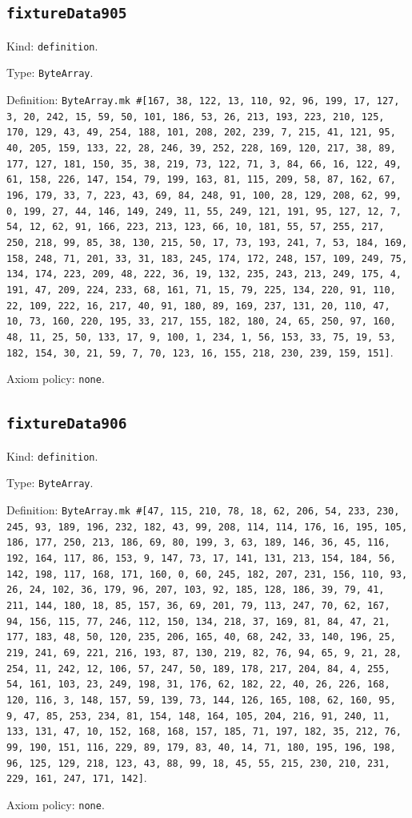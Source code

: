 \documentclass[11pt]{article}
\begin{document}
\subsection*{\texttt{fixtureData905}}
\noindent Kind: \texttt{definition}.\par
\noindent Type: \texttt{ByteArray}.\par
\noindent Definition: \texttt{ByteArray.mk \#[167, 38, 122, 13, 110, 92, 96, 199, 17, 127, 3, 20, 242, 15, 59, 50, 101, 186, 53, 26, 213, 193, 223, 210, 125, 170, 129, 43, 49, 254, 188, 101, 208, 202, 239, 7, 215, 41, 121, 95, 40, 205, 159, 133, 22, 28, 246, 39, 252, 228, 169, 120, 217, 38, 89, 177, 127, 181, 150, 35, 38, 219, 73, 122, 71, 3, 84, 66, 16, 122, 49, 61, 158, 226, 147, 154, 79, 199, 163, 81, 115, 209, 58, 87, 162, 67, 196, 179, 33, 7, 223, 43, 69, 84, 248, 91, 100, 28, 129, 208, 62, 99, 0, 199, 27, 44, 146, 149, 249, 11, 55, 249, 121, 191, 95, 127, 12, 7, 54, 12, 62, 91, 166, 223, 213, 123, 66, 10, 181, 55, 57, 255, 217, 250, 218, 99, 85, 38, 130, 215, 50, 17, 73, 193, 241, 7, 53, 184, 169, 158, 248, 71, 201, 33, 31, 183, 245, 174, 172, 248, 157, 109, 249, 75, 134, 174, 223, 209, 48, 222, 36, 19, 132, 235, 243, 213, 249, 175, 4, 191, 47, 209, 224, 233, 68, 161, 71, 15, 79, 225, 134, 220, 91, 110, 22, 109, 222, 16, 217, 40, 91, 180, 89, 169, 237, 131, 20, 110, 47, 10, 73, 160, 220, 195, 33, 217, 155, 182, 180, 24, 65, 250, 97, 160, 48, 11, 25, 50, 133, 17, 9, 100, 1, 234, 1, 56, 153, 33, 75, 19, 53, 182, 154, 30, 21, 59, 7, 70, 123, 16, 155, 218, 230, 239, 159, 151]}.\par
\noindent Axiom policy: \texttt{none}.\par
\subsection*{\texttt{fixtureData906}}
\noindent Kind: \texttt{definition}.\par
\noindent Type: \texttt{ByteArray}.\par
\noindent Definition: \texttt{ByteArray.mk \#[47, 115, 210, 78, 18, 62, 206, 54, 233, 230, 245, 93, 189, 196, 232, 182, 43, 99, 208, 114, 114, 176, 16, 195, 105, 186, 177, 250, 213, 186, 69, 80, 199, 3, 63, 189, 146, 36, 45, 116, 192, 164, 117, 86, 153, 9, 147, 73, 17, 141, 131, 213, 154, 184, 56, 142, 198, 117, 168, 171, 160, 0, 60, 245, 182, 207, 231, 156, 110, 93, 26, 24, 102, 36, 179, 96, 207, 103, 92, 185, 128, 186, 39, 79, 41, 211, 144, 180, 18, 85, 157, 36, 69, 201, 79, 113, 247, 70, 62, 167, 94, 156, 115, 77, 246, 112, 150, 134, 218, 37, 169, 81, 84, 47, 21, 177, 183, 48, 50, 120, 235, 206, 165, 40, 68, 242, 33, 140, 196, 25, 219, 241, 69, 221, 216, 193, 87, 130, 219, 82, 76, 94, 65, 9, 21, 28, 254, 11, 242, 12, 106, 57, 247, 50, 189, 178, 217, 204, 84, 4, 255, 54, 161, 103, 23, 249, 198, 31, 176, 62, 182, 22, 40, 26, 226, 168, 120, 116, 3, 148, 157, 59, 139, 73, 144, 126, 165, 108, 62, 160, 95, 9, 47, 85, 253, 234, 81, 154, 148, 164, 105, 204, 216, 91, 240, 11, 133, 131, 47, 10, 152, 168, 168, 157, 185, 71, 197, 182, 35, 212, 76, 99, 190, 151, 116, 229, 89, 179, 83, 40, 14, 71, 180, 195, 196, 198, 96, 125, 129, 218, 123, 43, 88, 99, 18, 45, 55, 215, 230, 210, 231, 229, 161, 247, 171, 142]}.\par
\noindent Axiom policy: \texttt{none}.\par
\end{document}
